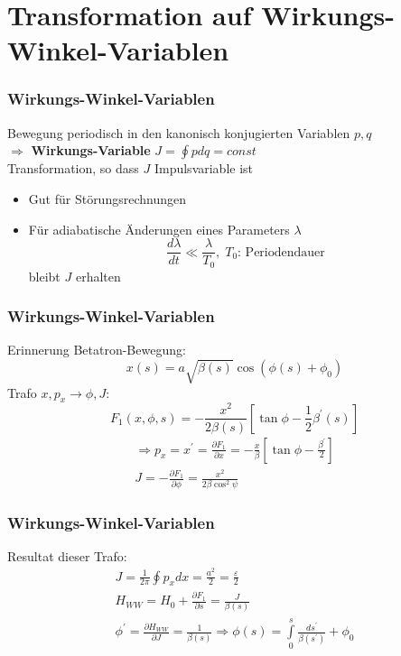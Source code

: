 \documentclass[hyperref={pdfpagelabels=false}]{beamer}
\begin{document}
\section{Transformation auf Wirkungs-Winkel-Variablen}
\begin{frame}
\frametitle{Wirkungs-Winkel-Variablen}
Bewegung periodisch in den kanonisch konjugierten Variablen $p,q$\\
$\Rightarrow$\textbf{ Wirkungs-Variable} $J = \oint p dq = const$\\
\vspace*{.7cm}\pause
Transformation, so dass $J$ Impulsvariable ist \begin{itemize}\item Gut für Störungsrechnungen  \item Für adiabatische Änderungen eines Parameters $\lambda$
\begin{equation*}
\frac{d\lambda }{dt} \ll \frac{\lambda}{T_0},\; T_0\text{: Periodendauer}
\end{equation*}
bleibt $J$ erhalten
\end{itemize}
\end{frame}
\begin{frame}
\frametitle{Wirkungs-Winkel-Variablen}
Erinnerung Betatron-Bewegung:
\begin{equation*}
x(s) = a \sqrt{\beta(s)} \cos (\phi(s) + \phi_0)
\end{equation*}
\pause
Trafo $x,p_x\rightarrow \phi,J$:
\begin{equation*}
F_1(x,\phi,s) = -\frac{x^2}{2\beta(s)}\left[ \tan \phi - \frac{1}{2}\beta^\prime(s)\right]
\end{equation*}\pause
\begin{gather*}\Rightarrow p_x = x^\prime = \frac{\partial F_1}{\partial x} = -\frac{x}{\beta}\left[\tan \phi - \frac{\beta^\prime}{2}\right]\\
J = - \frac{\partial F_1}{\partial \phi} = \frac{x^2}{2\beta\cos^2\psi}
\end{gather*}
\end{frame}

\begin{frame}
\frametitle{Wirkungs-Winkel-Variablen}
Resultat dieser Trafo:
\begin{gather*}
J = \frac{1}{2\pi} \oint p_x dx= \frac{a^2}{2} = \frac{\varepsilon}{2}\\
H_{WW} = H_0 + \frac{\partial F_1}{\partial s} =  \frac{J}{\beta(s)}\\
\phi^\prime = \frac{\partial H_{WW}}{\partial J} = \frac{1}{\beta(s)} \Rightarrow \phi(s) = \int\limits_{0}^s \frac{ds^\prime}{\beta(s^\prime)} + \phi_0
\end{gather*}
\end{frame}
\end{document}
